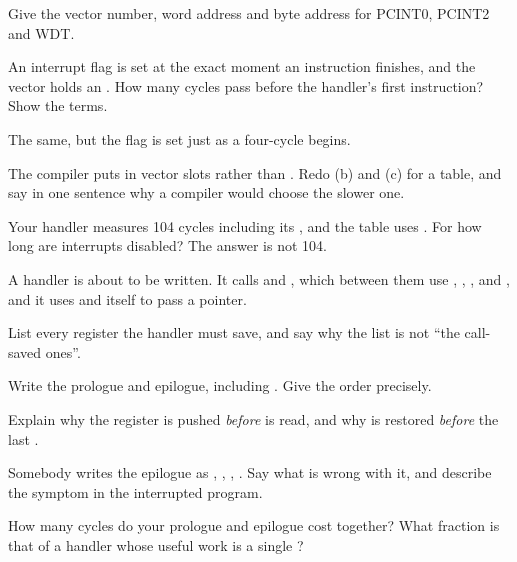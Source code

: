 \label{c3:ex:response}
\begin{parts}
  \item Give the vector number, word address and byte address for PCINT0, PCINT2 and WDT.
  \item An interrupt flag is set at the exact moment an instruction finishes, and the vector holds
    an . How many cycles pass before the handler's first instruction? Show the terms.
  \item The same, but the flag is set just as a four-cycle  begins.
  \item The compiler puts  in vector slots rather than . Redo (b) and (c) for
    a  table, and say in one sentence why a compiler would choose the slower one.
  \item Your handler measures 104 cycles including its , and the table uses
    . For how long are interrupts disabled? The answer is not 104.
\end{parts}

\label{c3:ex:prologue}
A handler is about to be written. It calls  and , which
between them use , , ,  and , and it uses
 and  itself to pass a pointer.
\begin{parts}
  \item List every register the handler must save, and say why the list is not ``the call-saved
    ones''.
  \item Write the prologue and epilogue, including . Give the order precisely.
  \item Explain why the register is pushed \emph{before}  is read, and why 
    is restored \emph{before} the last .
  \item Somebody writes the epilogue as , , ,
    . Say what is wrong with it, and describe the symptom in the interrupted program.
  \item How many cycles do your prologue and epilogue cost together? What fraction is that of a
    handler whose useful work is a single ?
\end{parts}

